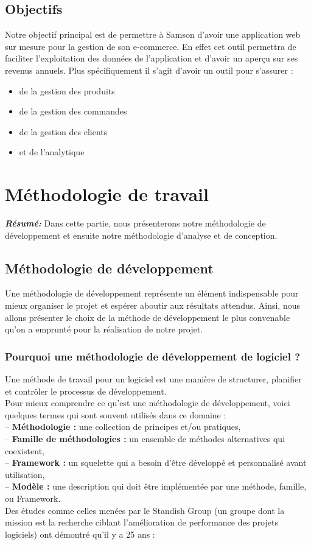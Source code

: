 \documentclass[a4paper, 12pt]{report}
\begin{document}
\subsection{Objectifs}
{Notre objectif principal est de permettre à Samson d’avoir une application web sur mesure pour la gestion de son e-commerce. En effet cet outil permettra de faciliter l’exploitation des données de l’application et d’avoir un aperçu sur ses revenus annuels. Plus spécifiquement il s’agit d’avoir un outil pour s’assurer :
\begin{itemize}
  \item de la gestion des produits 
  \item de la gestion des commandes
  \item de la gestion des clients
  \item et de l'analytique
\end{itemize} 
}

\section{ Méthodologie de travail}
\textit{\textbf{Résumé:} }
Dans cette partie, nous présenterons notre méthodologie de développement et ensuite notre méthodologie d'analyse et de conception.
\setcounter{minitocdepth}{1}
\minitoc

\subsection{Méthodologie de développement}
Une méthodologie de développement représente un élément indispensable pour mieux organiser le projet et espérer aboutir aux résultats attendus. Ainsi, nous allons présenter le choix de la méthode de développement le plus convenable qu’on a emprunté pour la réalisation de notre projet. 
\subsubsection{Pourquoi une méthodologie de développement de logiciel ?}
Une méthode de travail pour un logiciel est une manière de structurer, planifier et contrôler le processus de développement. 
\\
Pour mieux comprendre ce qu'est une méthodologie de développement, voici quelques termes qui sont souvent utilisés dans ce domaine : \\
-- \textbf{Méthodologie :} une collection de principes et/ou pratiques,\\ 
-- \textbf{Famille de méthodologies :} un ensemble de méthodes alternatives qui coexistent,\\
-- \textbf{Framework :} un squelette qui a besoin d'être développé et personnalisé avant utilisation,\\ 
-- \textbf{Modèle :} une description qui doit être implémentée par une méthode, famille, ou Framework.\\
Des études comme celles menées par le Standish Group (un groupe dont la mission est la recherche ciblant l’amélioration de performance des projets logiciels) ont démontré qu’il y a 25 ans : 
\end{document}
